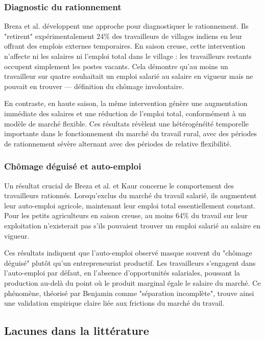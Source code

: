 \documentclass[12pt,a4paper]{article}
\begin{document}
\subsubsection{Diagnostic du rationnement}

Breza et al. \citeyearpar{breza2021} développent une approche pour diagnostiquer le rationnement. Ils "retirent" expérimentalement 24\% des travailleurs de villages indiens en leur offrant des emplois externes temporaires. En saison creuse, cette intervention n'affecte ni les salaires ni l'emploi total dans le village : les travailleurs restants occupent simplement les postes vacants. Cela démontre qu'au moins un travailleur sur quatre souhaitait un emploi salarié au salaire en vigueur mais ne pouvait en trouver — définition du chômage involontaire.

En contraste, en haute saison, la même intervention génère une augmentation immédiate des salaires et une réduction de l'emploi total, conformément à un modèle de marché flexible. Ces résultats révèlent une hétérogénéité temporelle importante dans le fonctionnement du marché du travail rural, avec des périodes de rationnement sévère alternant avec des périodes de relative flexibilité.

\subsubsection{Chômage déguisé et auto-emploi}

Un résultat crucial de Breza et al. \citeyearpar{breza2021} et Kaur \citeyearpar{kaur2019} concerne le comportement des travailleurs rationnés. Lorsqu'exclus du marché du travail salarié, ils augmentent leur auto-emploi agricole, maintenant leur emploi total essentiellement constant. Pour les petits agriculteurs en saison creuse, au moins 64\% du travail sur leur exploitation n'existerait pas s'ils pouvaient trouver un emploi salarié au salaire en vigueur.

Ces résultats indiquent que l'auto-emploi observé masque souvent du "chômage déguisé" plutôt qu'un entrepreneuriat productif. Les travailleurs s'engagent dans l'auto-emploi par défaut, en l'absence d'opportunités salariales, poussant la production au-delà du point où le produit marginal égale le salaire du marché. Ce phénomène, théorisé par Benjamin \citeyearpar{benjamin1992} comme "séparation incomplète", trouve ainsi une validation empirique claire liée aux frictions du marché du travail.

\subsection{Lacunes dans la littérature}
\end{document}

